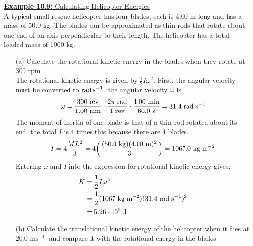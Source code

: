 \documentclass[a4paper]{article}
\let\bf\textbf
\newcommand\rads{\text{ rad\;s}^{-1}}
\newcommand\rad{\text{ rad}}
\newcommand\s{\text{ s}}
\newcommand\m{\text{ m}}
\newcommand\J{\text{ J}}
\newcommand\ms{\text{ ms}^{-1}}
\newcommand\kg{\text{ kg}}
\newcommand\kgmm{\text{ kg\;m}^{-2}}
\begin{document}
\newpage
\begin{shaded}
    \underline{\bf{Example 10.9:} Calculating Helicopter Energies}
    \vspace{2mm}\\
    A typical small rescue helicopter has four blades, each is 4.00 m long and has a mass of 50.0 kg. The blades can be approximated as thin rods that rotate about one end of an axis perpendicular to their length. The helicopter has a total loaded mass of 1000 kg.
    \begin{enumerate}
        \item[(a)] Calculate the rotational kinetic energy in the blades when they rotate at 300 rpm
        \vspace{2mm}\\
        The rotational kinetic energy is given by $\frac{1}{2}I\omega^2$. First, the angular velocity must be converted to$\rads$, the angular velocity $\omega$ is
        \begin{align*}
            \omega = \frac{300\text{ rev}}{1.00\text{ min}} \cdot \frac{2\pi\rad}{1\text{ rev}} \cdot \frac{1.00\text{ min}}{60.0\s} = 31.4\rads
        \end{align*}
        The moment of inertia of one blade is that of a thin rod rotated about its end, the total $I$ is 4 times this because there are 4 blades.
        \begin{align*}
            I = 4\frac{ML^2}{3} = 4\bigg(\frac{(50.0\kg)(4.00\m)^2}{3}\bigg) = 1067.0\kgmm
        \end{align*}
        Entering $\omega$ and $I$ into the expression for rotational kinetic energy gives:
        \begin{align*}
            K &= \frac{1}{2}I\omega^2\\
            &= \frac{1}{2}(1067\kgmm)(31.4\rads)^2\\
            &= 5.26 \cdot 10^5\J
        \end{align*}
        \item[(b)] Calculate the translational kinetic energy of the helicopter when it flies at 20.0$\ms$, and compare it with the rotational energy in the blades
    \end{enumerate}
\end{shaded}
\end{document}
